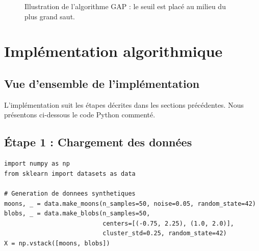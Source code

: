\documentclass[11pt,a4paper]{article}
\begin{document}
\begin{figure}[htbp]
\centering
{}
\caption{Illustration de l'algorithme GAP : le seuil est placé au milieu du plus grand saut.}
\label{fig:gap}
\end{figure}

\section{Implémentation algorithmique}

\subsection{Vue d'ensemble de l'implémentation}

L'implémentation suit les étapes décrites dans les sections précédentes. Nous présentons ci-dessous le code Python commenté.

\subsection{Étape 1 : Chargement des données}

\begin{lstlisting}[caption=Chargement et génération des données]
import numpy as np
from sklearn import datasets as data

# Generation de donnees synthetiques
moons, _ = data.make_moons(n_samples=50, noise=0.05, random_state=42)
blobs, _ = data.make_blobs(n_samples=50, 
                           centers=[(-0.75, 2.25), (1.0, 2.0)],
                           cluster_std=0.25, random_state=42)
X = np.vstack([moons, blobs])
\end{lstlisting}
\end{document}

